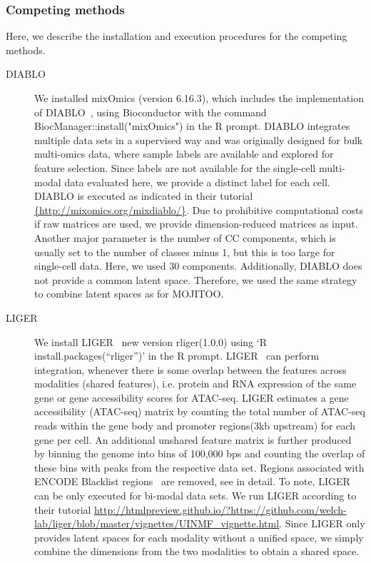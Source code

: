 \subsubsection{Competing methods}
\label{MOJITOO:exp:methods}
Here, we describe the installation and execution procedures for the competing methods.
\begin{description}
	\item[DIABLO]
    We installed mixOmics (version 6.16.3), which includes the implementation of DIABLO~\cite{singh2019diablo}, using Bioconductor with the command BiocManager::install("mixOmics") in the R prompt. DIABLO integrates multiple data sets in a supervised way and was originally designed for bulk multi-omics data, where sample labels are available and explored for feature selection. Since labels are not available for the single-cell multi-modal data evaluated here, we provide a distinct label for each cell. DIABLO is executed as indicated in their tutorial \url{{http://mixomics.org/mixdiablo/}}. Due to prohibitive computational costs if raw matrices are used, we provide dimension-reduced matrices as input. Another major parameter is the number of CC components, which is usually set to the number of classes minus 1, but this is too large for single-cell data. Here, we used 30 components. Additionally, DIABLO does not provide a common latent space. Therefore, we used the same strategy to combine latent spaces as for MOJITOO.

	\item[LIGER]
    We install LIGER~\citep{kriebel2021nonnegative} new version rliger(1.0.0) using `R install.packages(``rliger'')' in the R prompt. LIGER~\citep{kriebel2021nonnegative} can perform integration, whenever there is some overlap between the features across modalities (shared features), i.e. protein and RNA expression of the same gene or gene accessibility scores for ATAC-seq. LIGER estimates a gene accessibility (ATAC-seq) matrix by counting the total number of ATAC-seq reads within the gene body and promoter regions(3kb upstream) for each gene per cell. An additional unshared feature matrix is further produced by binning the genome into bins of 100,000 bps and counting the overlap of these bins with peaks from the respective data set. Regions associated with ENCODE Blacklist regions~\citep{amemiya2019encode} are removed, see in detail\citep{liu2020jointly}. To note, LIGER can be only executed for bi-modal data sets. We run LIGER according to their tutorial \url{http://htmlpreview.github.io/?https://github.com/welch-lab/liger/blob/master/vignettes/UINMF_vignette.html}. Since LIGER only provides latent spaces for each modality without a unified space, we simply combine the dimensions from the two modalities to obtain a shared space.


\end{description}

